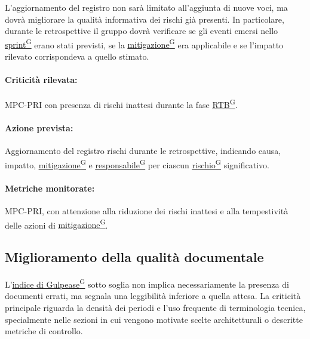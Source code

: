 \documentclass[a4paper,12pt]{article}
\providecommand{\glslink}[2]{\href{https://alittlebyte-19.github.io/Documentazione/glossario.html\#gls-#1}{\underline{#2}\textsuperscript{\scriptsize G}}}
\begin{document}
L'aggiornamento del registro non sarà limitato all'aggiunta di nuove voci, ma dovrà migliorare la qualità informativa dei rischi già presenti. In particolare, durante le retrospettive il gruppo dovrà verificare se gli eventi emersi nello \glslink{sprint}{sprint} erano stati previsti, se la \glslink{mitigazione-dei-rischi}{mitigazione} era applicabile e se l'impatto rilevato corrispondeva a quello stimato.

\paragraph*{Criticità rilevata:} MPC-PRI con presenza di rischi inattesi durante la fase \glslink{rtb-requirements-and-technology-baseline}{RTB}.

\paragraph*{Azione prevista:} Aggiornamento del registro rischi durante le retrospettive, indicando causa, impatto, \glslink{mitigazione-dei-rischi}{mitigazione} e \glslink{responsabile}{responsabile} per ciascun \glslink{rischio}{rischio} significativo.

\paragraph*{Metriche monitorate:} MPC-PRI, con attenzione alla riduzione dei rischi inattesi e alla tempestività delle azioni di \glslink{mitigazione-dei-rischi}{mitigazione}.

\subsection{Miglioramento della qualità documentale}

L'\glslink{indice-di-gulpease-mpc-ig}{indice di Gulpease} sotto soglia non implica necessariamente la presenza di documenti errati, ma segnala una leggibilità inferiore a quella attesa. La criticità principale riguarda la densità dei periodi e l'uso frequente di terminologia tecnica, specialmente nelle sezioni in cui vengono motivate scelte architetturali o descritte metriche di controllo.
\end{document}
